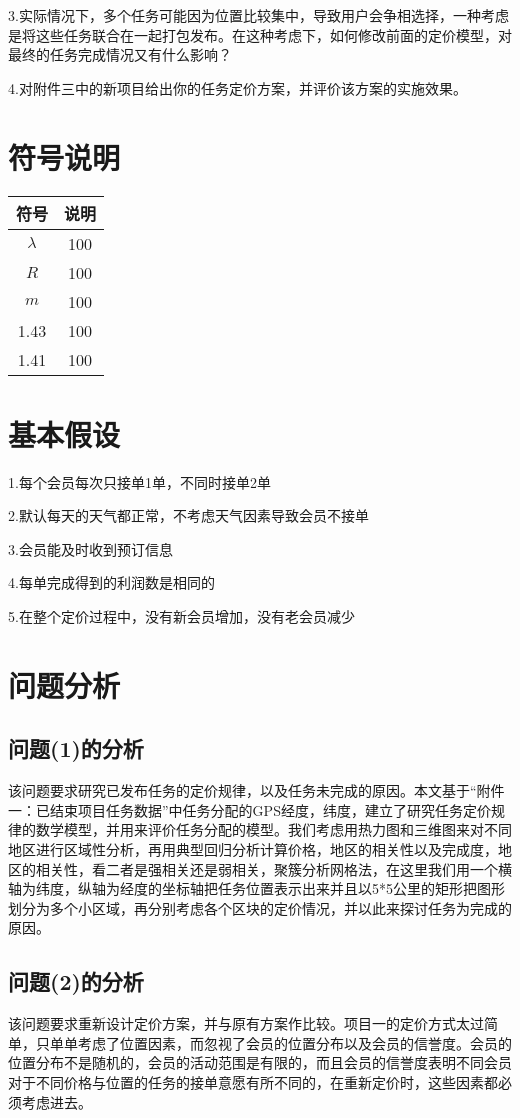\documentclass{ctexart}
\begin{document}
3.实际情况下，多个任务可能因为位置比较集中，导致用户会争相选择，一种考虑是将这些任务联合在一起打包发布。在这种考虑下，如何修改前面的定价模型，对最终的任务完成情况又有什么影响？

4.对附件三中的新项目给出你的任务定价方案，并评价该方案的实施效果。
\section{符号说明}
\begin{table}[htbp]\large
\centering
\begin{tabular}{|c|c|}
\hline
符号&说明\\
\hline
$\lambda$ &100\\
\hline
$R$&100\\
\hline
$m$&100\\
\hline
1.43&100\\
\hline
1.41&100\\
\hline
\end{tabular}
\end{table}
\section{基本假设}
1.每个会员每次只接单1单，不同时接单2单

2.默认每天的天气都正常，不考虑天气因素导致会员不接单

3.会员能及时收到预订信息

4.每单完成得到的利润数是相同的

5.在整个定价过程中，没有新会员增加，没有老会员减少
\section{问题分析}
\subsection{问题(1)的分析}
该问题要求研究已发布任务的定价规律，以及任务未完成的原因。本文基于“附件一：已结束项目任务数据”中任务分配的GPS经度，纬度，建立了研究任务定价规律的数学模型，并用来评价任务分配的模型。我们考虑用热力图和三维图来对不同地区进行区域性分析，再用典型回归分析计算价格，地区的相关性以及完成度，地区的相关性，看二者是强相关还是弱相关，聚簇分析网格法，在这里我们用一个横轴为纬度，纵轴为经度的坐标轴把任务位置表示出来并且以5*5公里的矩形把图形划分为多个小区域，再分别考虑各个区块的定价情况，并以此来探讨任务为完成的原因。
\subsection{问题(2)的分析}
该问题要求重新设计定价方案，并与原有方案作比较。项目一的定价方式太过简单，只单单考虑了位置因素，而忽视了会员的位置分布以及会员的信誉度。会员的位置分布不是随机的，会员的活动范围是有限的，而且会员的信誉度表明不同会员对于不同价格与位置的任务的接单意愿有所不同的，在重新定价时，这些因素都必须考虑进去。
\end{document}
